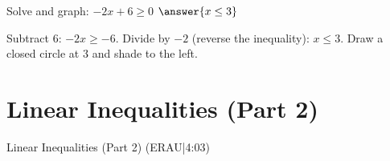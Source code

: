 \documentclass{ximera}
\begin{document}
\begin{problem}
Solve and graph: $-2x + 6 \geq 0$ $\answer{x \leq 3}$
\begin{feedback}
Subtract $6$: $-2x \geq -6$. Divide by $-2$ (reverse the inequality): $x \leq 3$. Draw a closed circle at $3$ and shade to the left.
\end{feedback}
\end{problem}


\section*{Linear Inequalities (Part 2)}

Linear Inequalities (Part 2) (ERAU|4:03)

\end{document}
